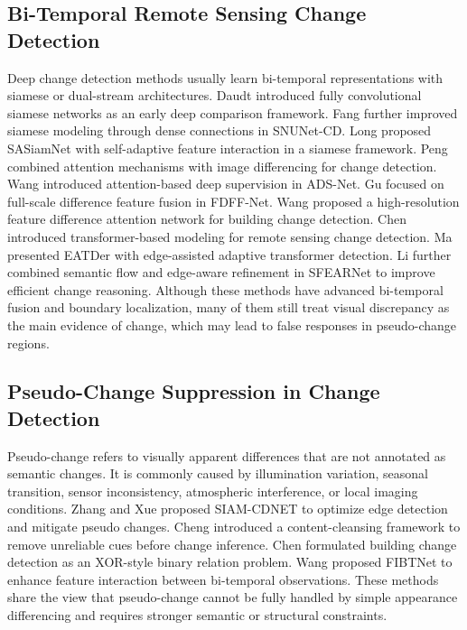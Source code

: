     \subsection{Bi-Temporal Remote Sensing Change Detection}\label{sec:RelatedWork:ChangeDetection}
        Deep change detection methods usually learn bi-temporal representations with siamese or dual-stream architectures. Daudt \etal introduced fully convolutional siamese networks as an early deep comparison framework\cite{fully-rs}. Fang \etal further improved siamese modeling through dense connections in SNUNet-CD\cite{Siamese-network}. Long \etal proposed SASiamNet\cite{Self-adaptive-Siamese-network} with self-adaptive feature interaction in a siamese framework. Peng \etal combined attention mechanisms with image differencing for change detection\cite{attention-sample}. Wang \etal introduced attention-based deep supervision in ADS-Net\cite{deeply-supervised-network}. Gu \etal focused on full-scale difference feature fusion in FDFF-Net\cite{full-scale-difference-feature-fusion-network}. Wang \etal proposed a high-resolution feature difference attention network for building change detection\cite{feature-difference-attention-network}. Chen \etal introduced transformer-based modeling for remote sensing change detection\cite{transformers-rs}. Ma \etal presented EATDer\cite{ma2023eatder} with edge-assisted adaptive transformer detection. Li \etal further combined semantic flow and edge-aware refinement in SFEARNet\cite{sfearnet} to improve efficient change reasoning. Although these methods have advanced bi-temporal fusion and boundary localization, many of them still treat visual discrepancy as the main evidence of change, which may lead to false responses in pseudo-change regions.
        
    \IEEEpubidadjcol
    
    \subsection{Pseudo-Change Suppression in Change Detection}\label{sec:RelatedWork:PseudoChange}
        Pseudo-change refers to visually apparent differences that are not annotated as semantic changes. It is commonly caused by illumination variation, seasonal transition, sensor inconsistency, atmospheric interference, or local imaging conditions. Zhang and Xue proposed SIAM-CDNET\cite{optimized-edge-detection} to optimize edge detection and mitigate pseudo changes. Cheng \etal introduced a content-cleansing framework to remove unreliable cues before change inference\cite{harmony}. Chen \etal formulated building change detection as an XOR-style binary relation problem\cite{buildings}. Wang \etal proposed FIBTNet\cite{Feature-Interactive} to enhance feature interaction between bi-temporal observations. These methods share the view that pseudo-change cannot be fully handled by simple appearance differencing and requires stronger semantic or structural constraints.

